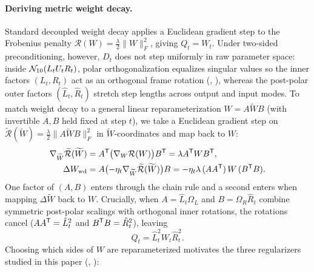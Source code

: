 \paragraph{Deriving metric weight decay.}
Standard decoupled weight decay applies a Euclidean gradient step to the Frobenius penalty $\mathcal R(W)=\frac{\lambda}{2}\|W\|_F^2$, giving $Q_t=W_t$. Under two-sided preconditioning, however, $D_t$ does not step uniformly in raw parameter space: inside $\mathcal{N}_{10}(L_t U_t R_t)$, polar orthogonalization equalizes singular values so the inner factors $(L_t,R_t)$ act as an orthogonal frame rotation (, ), whereas the post-polar outer factors $(\hat L_t,\hat R_t)$ stretch step lengths across output and input modes. To match weight decay to a general linear reparameterization $W=A\widetilde W B$ (with invertible $A,B$ held fixed at step $t$), we take a Euclidean gradient step on $\widetilde{\mathcal R}(\widetilde W)=\frac{\lambda}{2}\|A\widetilde W B\|_F^2$ in $\widetilde W$-coordinates and map back to $W$:
\begin{align*}
 \nabla_{\widetilde W}\widetilde{\mathcal R}(\widetilde W)
 &=A^{{\mathsf{T}}}\bigl(\nabla_W\mathcal R(W)\bigr)B^{{\mathsf{T}}}
  =\lambda A^{{\mathsf{T}}}WB^{{\mathsf{T}}},\\
 \Delta W_{\mathrm{wd}}
 &=A\bigl(-\eta_t\nabla_{\widetilde W}\widetilde{\mathcal R}(\widetilde W)\bigr)B
  =-\eta_t\lambda\,(AA^{{\mathsf{T}}})\,W\,(B^{{\mathsf{T}}}B).
\end{align*}
One factor of $(A,B)$ enters through the chain rule and a second enters when mapping $\Delta\widetilde W$ back to $W$. Crucially, when $A=\hat L_t\Omega_L$ and $B=\Omega_R\hat R_t$ combine symmetric post-polar scalings with orthogonal inner rotations, the rotations cancel ($AA^{{\mathsf{T}}}=\hat L_t^2$ and $B^{{\mathsf{T}}}B=\hat R_t^2$), leaving
\[
 Q_t=\hat L_t^2 W_t\hat R_t^2.
\]
Choosing which sides of $W$ are reparameterized motivates the three regularizers studied in this paper (, ):
